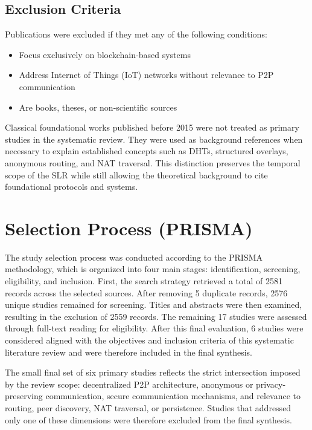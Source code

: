 \documentclass[12pt,a4paper]{article}
\begin{document}
\subsection{Exclusion Criteria}

Publications were excluded if they met any of the following conditions:

\begin{itemize}
    \item Focus exclusively on blockchain-based systems
    \item Address Internet of Things (IoT) networks without relevance to P2P communication
    \item Are books, theses, or non-scientific sources
\end{itemize}

Classical foundational works published before 2015 were not treated as primary studies in the systematic review. They were used as background references when necessary to explain established concepts such as DHTs, structured overlays, anonymous routing, and NAT traversal. This distinction preserves the temporal scope of the SLR while still allowing the theoretical background to cite foundational protocols and systems.

\clearpage
\section{Selection Process (PRISMA)}

\thesisprismatikz

The study selection process was conducted according to the PRISMA methodology, which is organized into four main stages: identification, screening, eligibility, and inclusion. First, the search strategy retrieved a total of 2581 records across the selected sources. After removing 5 duplicate records, 2576 unique studies remained for screening. Titles and abstracts were then examined, resulting in the exclusion of 2559 records. The remaining 17 studies were assessed through full-text reading for eligibility. After this final evaluation, 6 studies were considered aligned with the objectives and inclusion criteria of this systematic literature review and were therefore included in the final synthesis.

The small final set of six primary studies reflects the strict intersection imposed by the review scope: decentralized P2P architecture, anonymous or privacy-preserving communication, secure communication mechanisms, and relevance to routing, peer discovery, NAT traversal, or persistence. Studies that addressed only one of these dimensions were therefore excluded from the final synthesis.
\end{document}

